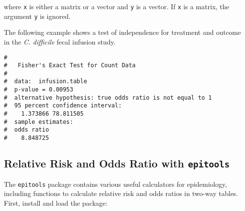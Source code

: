 \documentclass[letterpaper,12pt,twoside,]{pinp}
\begin{document}
where \texttt{x} is either a matrix or a vector and \texttt{y} is a
vector. If \texttt{x} is a matrix, the argument \texttt{y} is ignored.

The following example shows a test of independence for treatment and
outcome in the \emph{C. difficile} fecal infusion study.

\begin{Shaded}
\begin{Highlighting}[]
\StringTok{ }\NormalTok{(}\NormalTok{(}\NormalTok{, }\NormalTok{, }\NormalTok{, }\NormalTok{), } \NormalTok{, } \NormalTok{, }
\StringTok{ }\NormalTok{(}\NormalTok{ =}\StringTok{ }\NormalTok{(}\NormalTok{, }\NormalTok{),}
                           \NormalTok{ =}\StringTok{ }\NormalTok{(}\NormalTok{, }\NormalTok{))}

\end{Highlighting}
\end{Shaded}

\begin{ShadedResult}
\begin{verbatim}
#  
#   Fisher's Exact Test for Count Data
#  
#  data:  infusion.table
#  p-value = 0.00953
#  alternative hypothesis: true odds ratio is not equal to 1
#  95 percent confidence interval:
#    1.373866 78.811505
#  sample estimates:
#  odds ratio 
#    8.848725
\end{verbatim}
\end{ShadedResult}

\hypertarget{relative-risk-and-odds-ratio-with}{%
\subsection{\texorpdfstring{Relative Risk and Odds Ratio with
\texttt{epitools}}{Relative Risk and Odds Ratio with }}\label{relative-risk-and-odds-ratio-with}}

The \texttt{epitools} package contains various useful calculators for
epidemiology, including functions to calculate relative risk and odds
ratios in two-way tables. First, install and load the package:
\end{document}
